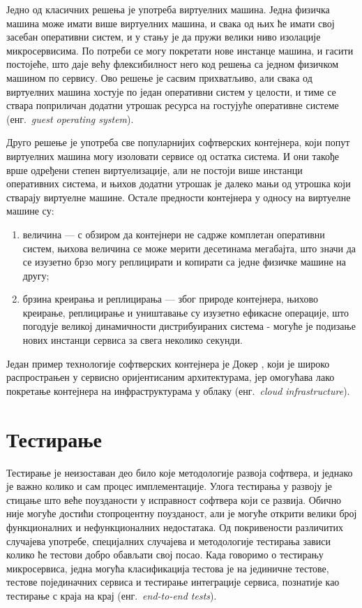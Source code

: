 \documentclass[12pt,oneside]{memoir}
\begin{document}
Једно од класичних решења је употреба виртуелних машина. Једна физичка машина може имати више виртуелних машина, и свака од њих ће имати свој засебан оперативни систем, и у стању је да пружи велики ниво изолације микросервисима. По потреби се могу покретати нове инстанце машина, и гасити постојеће, што даје већу флексибилност него код решења са једном физичком машином по сервису. Ово решење је сасвим прихватљиво, али свака од виртуелних машина хостује по један оперативни систем у целости, и тиме се ствара поприличан додатни утрошак ресурса на гостујуће оперативне системе (енг.~\textit{guest operating system}).

Друго решење је употреба све популарнијих софтверских контејнера, који попут виртуелних машина могу изоловати сервисе од остатка система. И они такође врше одређени степен виртуелизације, али не постоји више инстанци оперативних система, и њихов додатни утрошак је далеко мањи од утрошка који стварају виртуелне машине. Остале предности контејнера у односу на виртуелне машине су:
\begin{enumerate}
\item величина --- с обзиром да контејнери не садрже комплетан оперативни систем, њихова величина се може мерити десетинама мегабајта, што значи да се изузетно брзо могу реплицирати и копирати са једне физичке машине на другу;
\item брзина креирања и реплицирања --- због природе контејнера, њихово креирање, реплицирање и уништавање су изузетно ефикасне операције, што погодује великој динамичности дистрибуираних система - могуће је подизање нових инстанци сервиса за свега неколико секунди.
\end{enumerate}
Један пример технологије софтверских контејнера је Докер \cite{Docker}, који је широко распрострањен у сервисно оријентисаним архитектурама, јер омогућава лако покретање контејнера на инфраструктурама у облаку (енг.~\textit{cloud infrastructure}).

\section{Тестирање}
Тестирање је неизоставан део било које методологије развоја софтвера, и једнако је важно колико и сам процес имплементације. Улога тестирања у развоју је стицање што веће поузданости у исправност софтвера који се развија. Обично није могуће достићи стопроцентну поузданост, али је могуће открити велики број функционалних и нефункционалних недостатака. Од покривености различитих случајева употребе, специјалних случајева и методологије тестирања зависи колико ће тестови добро обављати свој посао. Када говоримо о тестирању микросервиса, једна могућа класификација тестова је на јединичне тестове, тестове појединачних сервиса и тестирање интеграције сервиса, познатије као тестирање с краја на крај (енг.~\textit{end-to-end tests}).
\end{document}
